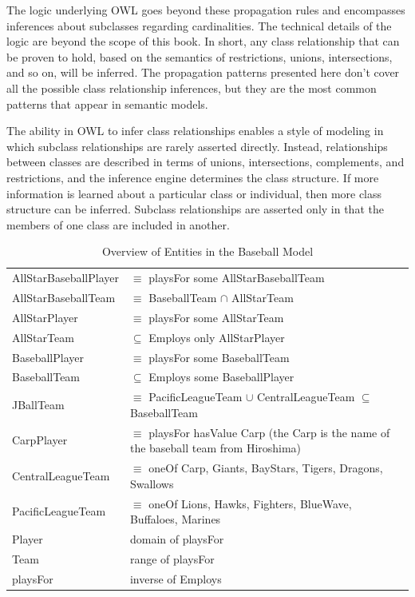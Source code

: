 The logic underlying OWL goes beyond these propagation rules and
encompasses inferences about subclasses regarding cardinalities. The
technical details of the logic are beyond the scope of this book. In
short, any class relationship that can be proven to hold, based on the
semantics of restrictions, unions, intersections, and so on, will be
inferred. The propagation patterns presented here don't cover all the
possible class relationship inferences, but they are the most common
patterns that appear in semantic models.

The ability in OWL to infer class relationships enables a style of
modeling in which subclass relationships are rarely asserted directly.
Instead, relationships between classes are described in terms
of unions, intersections, complements, and restrictions, and the
inference engine determines the class structure. If more information is
learned about a particular class or individual, then more class
structure can be inferred. Subclass relationships are asserted only in
that the members of one class are included in another.




\begin{table}
\caption{Overview of Entities in the Baseball Model}
\label{tab:ch13.1}
\begin{tabular}{|ll|}
AllStarBaseballPlayer&$\equiv$ playsFor some AllStarBaseballTeam \\
AllStarBaseballTeam&$\equiv$ BaseballTeam $\cap$ AllStarTeam \\
AllStarPlayer&$\equiv$ playsFor some AllStarTeam  \\
AllStarTeam&$\subseteq$ Employs only AllStarPlayer \\ 
BaseballPlayer&$\equiv$ playsFor some BaseballTeam  \\
BaseballTeam&$\subseteq$ Employs some BaseballPlayer \\
JBallTeam&$\equiv$ PacificLeagueTeam $\cup$ CentralLeagueTeam $\subseteq$ BaseballTeam \\
CarpPlayer &$\equiv$ playsFor hasValue Carp (the Carp is the name of the
baseball team from Hiroshima) \\
CentralLeagueTeam&$\equiv$ oneOf Carp, Giants, BayStars, Tigers, Dragons, Swallows \\
PacificLeagueTeam&$\equiv$ oneOf Lions, Hawks, Fighters, BlueWave, Buffaloes, Marines \\
Player&domain of playsFor  \\
Team&range of playsFor  \\
playsFor&inverse of Employs \\
\end{tabular}
\end{table}



